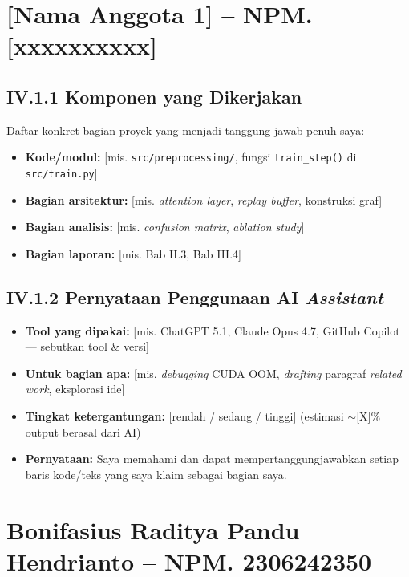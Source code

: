 \documentclass[11pt,a4paper,oneside]{report}
\begin{document}
\section{[Nama Anggota 1] -- NPM. [xxxxxxxxxx]}

\subsection*{IV.1.1 Komponen yang Dikerjakan}
Daftar konkret bagian proyek yang menjadi tanggung jawab penuh saya:
\begin{itemize}[leftmargin=*]
    \item \textbf{Kode/modul:} [mis. \texttt{src/preprocessing/}, fungsi \texttt{train\_step()} di \texttt{src/train.py}]
    \item \textbf{Bagian arsitektur:} [mis. \textit{attention layer}, \textit{replay buffer}, konstruksi graf]
    \item \textbf{Bagian analisis:} [mis. \textit{confusion matrix}, \textit{ablation study}]
    \item \textbf{Bagian laporan:} [mis. Bab II.3, Bab III.4]
\end{itemize}

\subsection*{IV.1.2 Pernyataan Penggunaan AI \textit{Assistant}}
\begin{itemize}[leftmargin=*]
    \item \textbf{Tool yang dipakai:} [mis. ChatGPT 5.1, Claude Opus 4.7, GitHub Copilot --- sebutkan tool \& versi]
    \item \textbf{Untuk bagian apa:} [mis. \textit{debugging} CUDA OOM, \textit{drafting} paragraf \textit{related work}, eksplorasi ide]
    \item \textbf{Tingkat ketergantungan:} [rendah / sedang / tinggi] (estimasi $\sim$[X]\% output berasal dari AI)
    \item \textbf{Pernyataan:} Saya memahami dan dapat mempertanggungjawabkan setiap baris kode/teks yang saya klaim sebagai bagian saya.
\end{itemize}

\section{Bonifasius Raditya Pandu Hendrianto -- NPM. 2306242350}
\end{document}
